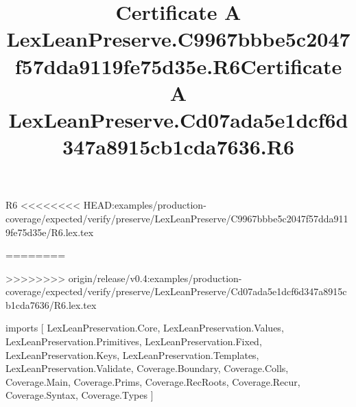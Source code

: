 \begin{lexlean}{R6}
<<<<<<<< HEAD:examples/production-coverage/expected/verify/preserve/LexLeanPreserve/C9967bbbe5c2047f57dda9119fe75d35e/R6.lex.tex
\title{Certificate A LexLeanPreserve.C9967bbbe5c2047f57dda9119fe75d35e.R6}
========
\title{Certificate A LexLeanPreserve.Cd07ada5e1dcf6d347a8915cb1cda7636.R6}
>>>>>>>> origin/release/v0.4:examples/production-coverage/expected/verify/preserve/LexLeanPreserve/Cd07ada5e1dcf6d347a8915cb1cda7636/R6.lex.tex
\begin{coremodule}
imports [
  LexLeanPreservation.Core,
  LexLeanPreservation.Values,
  LexLeanPreservation.Primitives,
  LexLeanPreservation.Fixed,
  LexLeanPreservation.Keys,
  LexLeanPreservation.Templates,
  LexLeanPreservation.Validate,
  Coverage.Boundary,
  Coverage.Colls,
  Coverage.Main,
  Coverage.Prims,
  Coverage.RecRoots,
  Coverage.Recur,
  Coverage.Syntax,
  Coverage.Types
]


\end{coremodule}
\end{lexlean}
